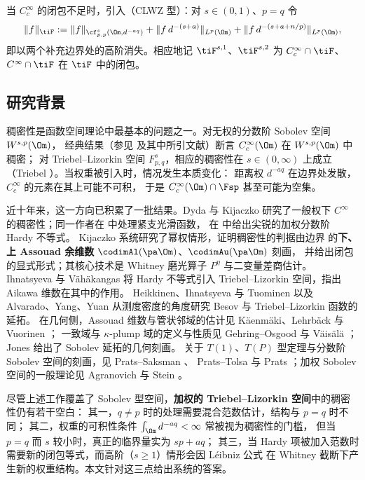 当 $C_c^\infty$ 的闭包不足时，引入（CLWZ 型）：对 $s\in(0,1)$、$p=q$ 令
\begin{equation}\label{eq:hardy-norm}
  \|f\|_{\tiF}:= \|f\|_{\cf^s_{p,p}(\Om,d^{-aq})}
  +\|f\,d^{-(s+a)}\|_{L^p(\Om)}
  +\|f\,d^{-(s+a+n/p)}\|_{L^p(\Om)} ,
\end{equation}
即以两个补充边界处的高阶消失。相应地记 $\tiF^{s,1}$、$\tiF^{s,2}$ 为
$C_c^\infty\cap\tiF$、$C^\infty\cap\tiF$ 在 $\tiF$ 中的闭包。

\subsection{研究背景}\label{ss1.2}

稠密性是函数空间理论中最基本的问题之一。对无权的分数阶 Sobolev 空间 $W^{s,p}(\Om)$，
经典结果（参见 \cite{s1970} 及其中所引文献）断言 $C_c^\infty(\Om)$ 在 $W^{s,p}(\Om)$ 中稠密；
对 Triebel--Lizorkin 空间 $F^s_{p,q}$，相应的稠密性在 $s\in(0,\infty)$ 上成立
（Triebel \cite{t2001,t2008,t2010}）。当权重被引入时，情况发生本质变化：
距离权 $d^{-aq}$ 在边界处发散，$C_c^\infty$ 的元素在其上可能不可积，
于是 $C_c^\infty(\Om)\cap\Fsp$ 甚至可能为空集。

近十年来，这一方向已积累了一批结果。Dyda 与 Kijaczko \cite{dk2021} 研究了一般权下
$C^\infty$ 的稠密性；同一作者在 \cite{dk2022} 中处理紧支光滑函数，
在 \cite{dk2024} 中给出尖锐的加权分数阶 Hardy 不等式。
Kijaczko \cite{k2023} 系统研究了幂权情形，证明稠密性的判据由边界
的\textbf{下、上 Assouad 余维数} $\codimAl(\pa\Om)$、$\codimAu(\pa\Om)$ 刻画，
并给出闭包的显式形式；其核心技术是 Whitney 磨光算子 $P^\eta$ 与二变量差商估计。
Ihnatsyeva 与 V\"ah\"akangas \cite{iv2013,iv2015} 将 Hardy 不等式引入
Triebel--Lizorkin 空间，指出 Aikawa 维数在其中的作用。
Heikkinen、Ihnatsyeva 与 Tuominen \cite{hit2016} 以及 Alvarado、Yang、Yuan \cite{ayy2022}
从测度密度的角度研究 Besov 与 Triebel--Lizorkin 函数的延拓。
在几何侧，Assouad 维数与管状邻域的估计见 K\"aenm\"aki、Lehrb\"ack 与 Vuorinen \cite{klv2013}；
一致域与 $\kappa$-plump 域的定义与性质见 Gehring--Osgood \cite{go1979} 与 V\"ais\"al\"a \cite{v1988}；
Jones \cite{j1981} 给出了 Sobolev 延拓的几何刻画。
关于 $T(1)$、$T(P)$ 型定理与分数阶 Sobolev 空间的刻画，见 Prats--Saksman \cite{ps2017}、
Prats--Tolsa \cite{pt2015} 与 Prats \cite{p2019}；加权 Sobolev 空间的一般理论见
Agranovich \cite{a2015} 与 Stein \cite{s1970}。

尽管上述工作覆盖了 Sobolev 型空间，\textbf{加权的 Triebel--Lizorkin 空间}中的稠密性仍有若干空白：
其一，$q\ne p$ 时的处理需要混合范数估计，结构与 $p=q$ 时不同；
其二，权重的可积性条件 $\int_\Om d^{-aq}<\infty$ 常被视为稠密性的门槛，
但当 $p=q$ 而 $s$ 较小时，真正的临界量实为 $sp+aq$；
其三，当 Hardy 项被加入范数时需要新的闭包等式，而高阶（$s\ge1$）情形会因 Léibniz 公式
在 Whitney 截断下产生新的权重结构。本文针对这三点给出系统的答案。


